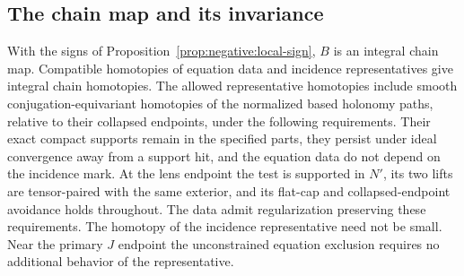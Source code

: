 \subsection{The chain map and its invariance}

\begin{proposition}\label{prop:negative:invariance}
With the signs of Proposition~\ref{prop:negative:local-sign}, $B$ is
an integral chain map.  Compatible homotopies of equation data and
incidence representatives give integral chain homotopies.  The allowed
representative homotopies include smooth conjugation-equivariant
homotopies of the normalized based holonomy paths, relative to their
collapsed endpoints, under the following requirements.  Their exact
compact supports remain in the specified parts, they persist under
ideal convergence away from a support hit, and the equation data do
not depend on the incidence mark.  At the lens endpoint the test is
supported in $N'$, its two lifts are tensor-paired with the same
exterior, and its flat-cap and collapsed-endpoint avoidance holds
throughout.  The data admit regularization preserving these
requirements.  The homotopy of the incidence representative need not
be small.  Near the primary $J$ endpoint the unconstrained equation
exclusion requires no additional behavior of the representative.
\end{proposition}

